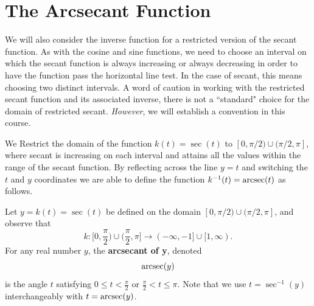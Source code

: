 \documentclass{ximera}
\begin{document}
\section{The Arcsecant Function}
%
We will also consider the inverse function for a restricted version of the secant function. 
As with the cosine and sine functions, we need to choose an interval on which the secant function is always increasing or always decreasing in order to have the function pass the horizontal line test. In the case of secant, this means choosing two distinct intervals. A word of caution in working with the restricted secant function and its associated inverse, there is not a ``standard" choice for the domain of restricted secant. {\it However}, we will establish a convention in this course. 

We Restrict the domain of the function $k(t) = \sec(t)$ to $[0,\pi/2) \cup (\pi/2,\pi ]$, where secant is increasing on each interval and attains all the values within the range of the secant function. By reflecting across the line $y=t$ and switching the $t$ and $y$ coordinates we are able to define the function $k^{-1}(t)=\operatorname{arcsec}(t)$ as follows.

\begin{definition}
Let $y = k(t) = \sec(t)$ be defined on the domain $[0,\pi/2) \cup (\pi/2,\pi ]$, and observe that 
$$k: \Big[0,\frac{\pi}{2}\Big) \cup \Big(\frac{\pi}{2},\pi \Big] \rightarrow (-\infty,-1] \cup [1,\infty).$$ 
For any real number $y$, the {\bf arcsecant of y}, denoted
$$\operatorname{arcsec}(y)$$
is the angle $t$ satisfying $0 \leq t < \frac{\pi}{2}$ or $\frac{\pi}{2} < t \leq \pi$. Note that we use $t = \sec^{-1}(y)$ interchangeably with $t = \operatorname{arcsec}(y)$.
\end{definition}
\end{document}
